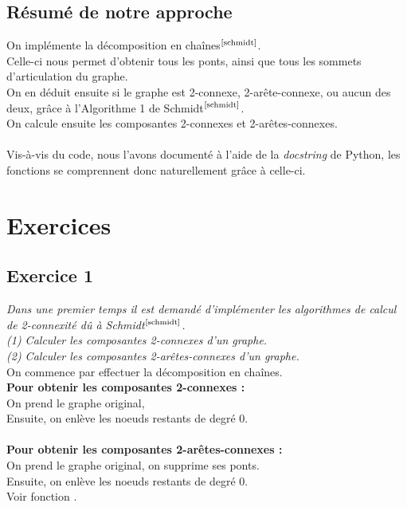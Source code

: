 \documentclass{article}      %
\begin{document}
\subsection{Résumé de notre approche}
On implémente la décomposition en chaînes$^\text{\cite{schmidt}}$.
\\Celle-ci nous permet d'obtenir tous les ponts, ainsi que tous les sommets d'articulation du graphe.
\\On en déduit ensuite si le graphe est 2-connexe, 2-arête-connexe, ou aucun des deux, grâce à l'Algorithme 1 de Schmidt$^\text{\cite{schmidt}}$.
\\On calcule ensuite les composantes 2-connexes et 2-arêtes-connexes.
\\\\Vis-à-vis du code, nous l'avons documenté à l'aide de la \textit{docstring} de Python, les fonctions se comprennent donc naturellement grâce à celle-ci.
%


\section{Exercices}
\subsection{Exercice 1}
\textit{\textcolor{exogris}{
Dans une premier temps il est demandé d’implémenter les algorithmes de calcul de 2-connexité dû à Schmidt$^\text{\cite{schmidt}}$.
\\(1) Calculer les composantes 2-connexes d’un graphe.
\\(2) Calculer les composantes 2-arêtes-connexes d’un graphe.
}}
\\On commence par effectuer la décomposition en chaînes.
\\\textbf{Pour obtenir les composantes 2-connexes :}
\\On prend le graphe original, 
\\Ensuite, on enlève les noeuds restants de degré 0.
%
%
\\\\\textbf{Pour obtenir les composantes 2-arêtes-connexes :}
\\On prend le graphe original, on supprime ses ponts.
\\Ensuite, on enlève les noeuds restants de degré 0.
\\Voir fonction .
%
\end{document}

